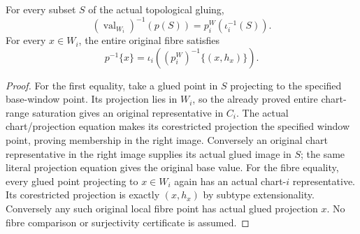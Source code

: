 \begin{lemma}
\label{hir:disjoint-proper-entire-window-dictionaries}
\leanok
For every subset $S$ of the actual topological gluing,
\[
 (\operatorname{val}_{W_i})^{-1}(p(S))=p_i^W(\iota_i^{-1}(S)).
\]
For every $x\in W_i$, the entire original fibre satisfies
\[
 p^{-1}\{x\}=\iota_i((p_i^W)^{-1}\{(x,h_x)\}).
\]
\end{lemma}
\begin{proof}
For the first equality, take a glued point in $S$ projecting to the specified
base-window point. Its projection lies in $W_i$, so the already proved
entire chart-range saturation gives an original representative in $C_i$.
The actual chart/projection equation makes its corestricted projection the
specified window point, proving membership in the right image. Conversely
an original chart representative in the right image supplies its actual
glued image in $S$; the same literal projection equation gives the original
base value. For the fibre equality, every glued point projecting to $x\in W_i$
again has an actual chart-$i$ representative. Its corestricted projection
is exactly $(x,h_x)$ by subtype extensionality. Conversely any such original
local fibre point has actual glued projection $x$. No fibre comparison or
surjectivity certificate is assumed.
\end{proof}

